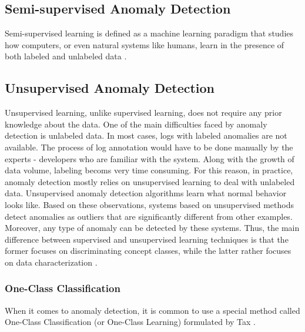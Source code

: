 \subsection{Semi-supervised Anomaly Detection} %
Semi-supervised learning is defined as a machine learning paradigm that studies how computers, or even natural systems like humans, learn in the presence of both labeled and unlabeled data \cite{zhu2009introduction}.

 
\subsection{Unsupervised Anomaly Detection}
Unsupervised learning, unlike supervised learning, does not require any prior knowledge about the data. One of the main difficulties faced by anomaly detection is unlabeled data. In most cases, logs with labeled anomalies are not available. The process of log annotation would have to be done manually by the experts - developers who are familiar with the system. Along with the growth of data volume, labeling becoms very time consuming. For this reason, in practice, anomaly detection mostly relies on unsupervised learning to deal with unlabeled data. Unsupervised anomaly detection algorithms learn what normal behavior looks like. Based on these observations, systems based on unsupervised methods detect anomalies as outliers that are significantly different from other examples. Moreover, any type of anomaly can be detected by these systems. Thus, the main difference between supervised and unsupervised learning techniques is that the former focuses on discriminating concept classes, while the latter rather focuses on data characterization \cite{Goernitz_2013}. %
 
\subsubsection{One-Class Classification}
When it comes to anomaly detection, it is common to use a special method called One-Class Classification (or One-Class Learning) formulated by Tax \cite{tax2002occ}. 
 
